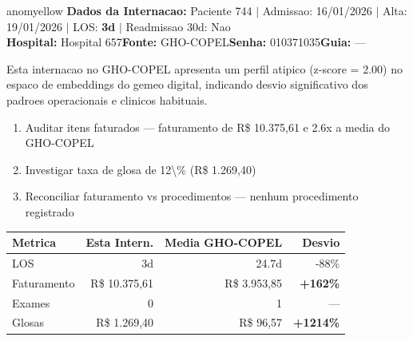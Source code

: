 \documentclass[a4paper,10pt]{article}
\begin{document}
\newpage

\begin{anomalycard}[Internacao 631 | GHO-COPEL | MODERADO (z=2.00)]{anomyellow}
\textbf{Dados da Internacao:} Paciente 744 $\mid$ Admissao: 16/01/2026 $\mid$ Alta: 19/01/2026 $\mid$ LOS: \textbf{3d} $\mid$ Readmissao 30d: Nao\\
\textbf{Hospital:} Hospital 657\quad\textbf{Fonte:} GHO-COPEL\quad\textbf{Senha:} 010371035\quad\textbf{Guia:} ---\\
\vspace{2pt}\begin{tcolorbox}[colback=severityred!20,colframe=anomyellow,title={\textbf{Interpretacao de Negocio}},fonttitle=\bfseries\small,left=4pt,right=4pt,top=3pt,bottom=3pt]
{\small Esta internacao no GHO-COPEL apresenta um perfil atipico (z-score = 2.00) no espaco de embeddings do gemeo digital, indicando desvio significativo dos padroes operacionais e clinicos habituais.}
\end{tcolorbox}
\begin{tcolorbox}[colback=severityyellow!30,colframe=anomorange,title={\textbf{Recomendacoes Especificas}},fonttitle=\bfseries\small,left=4pt,right=4pt,top=3pt,bottom=3pt]
\begin{enumerate}[nosep,leftmargin=16pt]
\item {\small Auditar itens faturados --- faturamento de R\$ 10.375,61 e 2.6x a media do GHO-COPEL}
\item {\small Investigar taxa de glosa de 12\textbackslash{}\% (R\$ 1.269,40)}
\item {\small Reconciliar faturamento vs procedimentos --- nenhum procedimento registrado}
\end{enumerate}
\end{tcolorbox}
\begin{center}\begin{tabular}{l r r r}\toprule\textbf{Metrica} & \textbf{Esta Intern.} & \textbf{Media GHO-COPEL} & \textbf{Desvio} \\\midrule
LOS & 3d & 24.7d & -88\% \\
Faturamento & R\$ 10.375,61 & R\$ 3.953,85 & \textcolor{anomred}{\textbf{+162\%}} \\
Exames & 0 & 1 & --- \\
Glosas & R\$ 1.269,40 & R\$ 96,57 & \textcolor{anomred}{\textbf{+1214\%}} \\
\bottomrule\end{tabular}\end{center}


\end{anomalycard}
\end{document}
